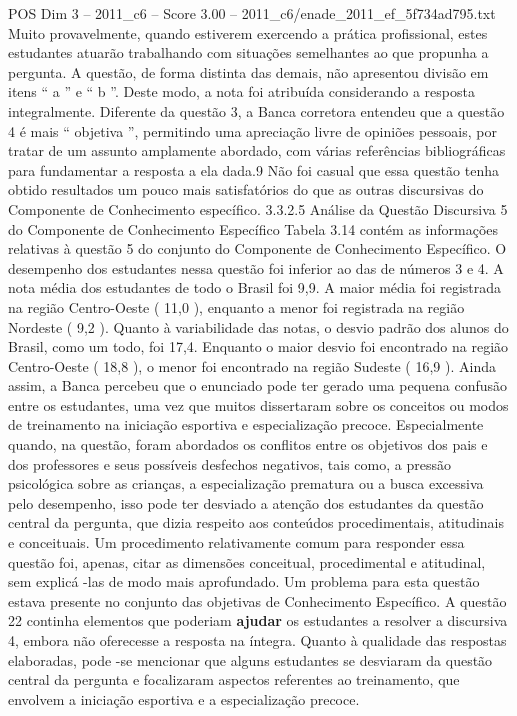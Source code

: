 \begin{textsample}{POS Dim 3 – 2011\_c6 – Score 3.00 – 2011\_c6/enade\_2011\_ef\_5f734ad795.txt}
Muito provavelmente, quando estiverem exercendo a prática profissional, estes estudantes atuarão trabalhando com situações semelhantes ao que propunha a pergunta.
A questão, de forma distinta das demais, não apresentou divisão em itens “ a ” e “ b ”.
Deste modo, a nota foi atribuída considerando a resposta integralmente.
Diferente da questão 3, a Banca corretora entendeu que a questão 4 é mais “ objetiva ”, permitindo uma apreciação livre de opiniões pessoais, por tratar de um assunto amplamente abordado, com várias referências bibliográficas para fundamentar a resposta a ela dada.9 Não foi casual que essa questão tenha obtido resultados um pouco mais satisfatórios do que as outras discursivas do Componente de Conhecimento específico. 3.3.2.5 Análise da Questão Discursiva 5 do Componente de Conhecimento Específico Tabela 3.14 contém as informações relativas à questão 5 do conjunto do Componente de Conhecimento Específico.
O desempenho dos estudantes nessa questão foi inferior ao das de números 3 e 4.
A nota média dos estudantes de todo o Brasil foi 9,9.
A maior média foi registrada na região Centro-Oeste ( 11,0 ), enquanto a menor foi registrada na região Nordeste ( 9,2 ).
Quanto à variabilidade das notas, o desvio padrão dos alunos do Brasil, como um todo, foi 17,4.
Enquanto o maior desvio foi encontrado na região Centro-Oeste ( 18,8 ), o menor foi encontrado na região Sudeste ( 16,9 ).
Ainda assim, a Banca percebeu que o enunciado pode ter gerado uma pequena confusão entre os estudantes, uma vez que muitos dissertaram sobre os conceitos ou modos de treinamento na iniciação esportiva e especialização precoce.
Especialmente quando, na questão, foram abordados os conflitos entre os objetivos dos pais e dos professores e seus possíveis desfechos negativos, tais como, a pressão psicológica sobre as crianças, a especialização prematura ou a busca excessiva pelo desempenho, isso pode ter desviado a atenção dos estudantes da questão central da pergunta, que dizia respeito aos conteúdos procedimentais, atitudinais e conceituais.
Um procedimento relativamente comum para responder essa questão foi, apenas, citar as dimensões conceitual, procedimental e atitudinal, sem explicá -las de modo mais aprofundado.
Um problema para esta questão estava presente no conjunto das objetivas de Conhecimento Específico.
A questão 22 continha elementos que poderiam \textbf{ajudar} os estudantes a resolver a discursiva 4, embora não oferecesse a resposta na íntegra.
Quanto à qualidade das respostas elaboradas, pode -se mencionar que alguns estudantes se desviaram da questão central da pergunta e focalizaram aspectos referentes ao treinamento, que envolvem a iniciação esportiva e a especialização precoce.

\end{textsample}

